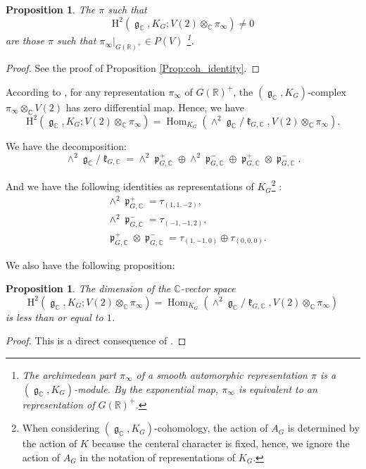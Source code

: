\documentclass[11pt, a4paper]{amsart}
\theoremstyle{plain}
\newtheorem{proposition}[theorem]{Proposition}
\theoremstyle{definition}
\numberwithin{equation}{section}
\def\CC{\mathbb{C}}
\def\RR{\mathbb{R}}
\DeclareMathOperator{\Hom}{Hom}
\DeclareMathOperator{\lieg}{\mathfrak g}
\DeclareMathOperator{\liek}{\mathfrak k}
\DeclareMathOperator{\liep}{\mathfrak p}
\begin{document}
\begin{proposition}
    The $\pi$ such that 
    \begin{equation*}
         \mathrm{H}^{2}(\lieg_{\CC}, K_{G}; V(2) \otimes_{\CC} \pi_{\infty}) \neq 0 
    \end{equation*}
    are those $\pi$ such that $\pi_{\infty}|_{G(\RR)^{+}} \in P(V)$ \footnote{The archimedean part $\pi_{\infty}$ of a smooth automorphic representation $\pi$ is a $(\lieg_{\CC}, K_{G})$-module. By the exponential map, $\pi_{\infty}$ is equivalent to an representation of $G(\RR)^{+}$.}. 
\end{proposition}

\begin{proof}
    See the proof of Proposition \ref{Prop:coh_identity}. 
\end{proof}

According to \cite[Chapter II, \S 3, Proposition 3.1]{Borel_Wallach}, for any representation $\pi_{\infty}$ of $G(\RR)^{+}$, 
the $(\lieg_{\CC}, K_{G})$-complex $\pi_{\infty} \otimes_{\CC} V(2)$ has zero differential map. Hence, we have 
\begin{equation*}
    \mathrm{H}^{2}(\lieg_{\CC}, K_{G}; V(2) \otimes_{\CC} \pi_{\infty}) = \Hom_{K_G}(\wedge^{2} \lieg_{\CC} / \liek_{G, \CC}, V(2) \otimes_{\CC} \pi_{\infty}). 
\end{equation*}

We have the decomposition: 
\begin{equation*}
    \wedge^{2} \lieg_{\CC} / \liek_{G, \CC} = \wedge^{2} \liep_{G, \CC}^{+} \oplus  \wedge^{2} \liep_{G, \CC}^{-} \oplus \liep_{G, \CC}^{+} \otimes \liep_{G, \CC}^{-}. 
\end{equation*}

And we have the following identities as representations of $K_G$\footnote{When considering $(\lieg_{\CC}, K_{G})$-cohomology, the action of $A_{G}$ is determined by the action of $K$ because the centeral character is fixed, hence, we ignore the action of $A_{G}$ in the notation of representations of $K_{G}$. } : 
\begin{align*}
     & \wedge^{2} \liep_{G, \CC}^{+} = \tau_{(1, 1, -2)},  \\
     & \wedge^{2} \liep_{G, \CC}^{-} = \tau_{(-1, -1, 2)},  \\
     & \liep_{G, \CC}^{+} \otimes \liep_{G, \CC}^{-} = \tau_{(1, -1, 0)} \oplus \tau_{(0, 0, 0)}. 
\end{align*}

We also have the following proposition:
\begin{proposition}
\label{Prop: (g, K)-cohomology = Hom}
    The dimension of the $\CC$-vector space 
    \begin{equation*}
         \mathrm{H}^{2}(\lieg_{\CC}, K_{G}; V(2) \otimes_{\CC} \pi_{\infty}) = \Hom_{K_G}(\wedge^{2} \lieg_{\CC} / \liek_{G, \CC}, V(2) \otimes_{\CC} \pi_{\infty})
    \end{equation*}
    is less than or equal to $1$.
\end{proposition}
\begin{proof}
    This is a direct consequence of \cite[II, Proposition 3.1. and Theorem 5.3.]{Borel_Wallach}. 
\end{proof}
\end{document}
